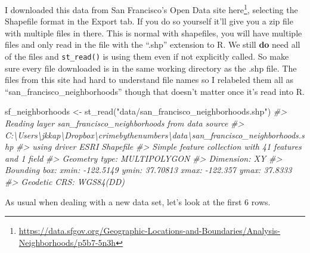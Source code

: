 \documentclass[
]{krantz}
\makeatletter
\newenvironment{Shaded}{\begin{snugshade}}{\end{snugshade}}
\newcommand{\CommentTok}[1]{\textcolor[rgb]{0.37,0.37,0.37}{\textit{#1}}}
\newcommand{\FunctionTok}[1]{\textcolor[rgb]{0,0,0}{#1}}
\newcommand{\NormalTok}[1]{#1}
\newcommand{\OtherTok}[1]{\textcolor[rgb]{0.37,0.37,0.37}{#1}}
\newcommand{\StringTok}[1]{\textcolor[rgb]{0.5,0.5,0.5}{#1}}
\renewcommand{\href}[2]{#2\footnote{\url{#1}}}
\newenvironment{kframe}{%
\medskip{}
\setlength{\fboxsep}{.8em}
 \def\at@end@of@kframe{}%
 \ifinner\ifhmode%
  \def\at@end@of@kframe{\end{minipage}}%
  \begin{minipage}{\columnwidth}%
 \fi\fi%
 \def\FrameCommand##1{\hskip\@totalleftmargin \hskip-\fboxsep
 \colorbox{shadecolor}{##1}\hskip-\fboxsep
     \hskip-\linewidth \hskip-\@totalleftmargin \hskip\columnwidth}%
 \MakeFramed {\advance\hsize-\width
   \@totalleftmargin\z@ \linewidth\hsize
   \@setminipage}}%
 {\par\unskip\endMakeFramed%
 \at@end@of@kframe}
\renewenvironment{Shaded}{\begin{kframe}}{\end{kframe}}
\makeatother
\begin{document}
I downloaded this data from San Francisco's Open Data site \href{https://data.sfgov.org/Geographic-Locations-and-Boundaries/Analysis-Neighborhoods/p5b7-5n3h}{here}, selecting the Shapefile format in the Export tab. If you do so yourself it'll give you a zip file with multiple files in there. This is normal with shapefiles, you will have multiple files and only read in the file with the ``.shp'' extension to R. We still \textbf{do} need all of the files and \texttt{st\_read()} is using them even if not explicitly called. So make sure every file downloaded is in the same working directory as the .shp file. The files from this site had hard to understand file names so I relabeled them all as ``san\_francisco\_neighborhoods'' though that doesn't matter once it's read into R.

\begin{Shaded}
\begin{Highlighting}[]
\NormalTok{sf\_neighborhoods }\OtherTok{\textless{}{-}} \FunctionTok{st\_read}\NormalTok{(}\StringTok{"data/san\_francisco\_neighborhoods.shp"}\NormalTok{)}
\CommentTok{\#\textgreater{} Reading layer \textasciigrave{}san\_francisco\_neighborhoods\textquotesingle{} from data source }
\CommentTok{\#\textgreater{}   \textasciigrave{}C:\textbackslash{}Users\textbackslash{}jkkap\textbackslash{}Dropbox\textbackslash{}crimebythenumbers\textbackslash{}data\textbackslash{}san\_francisco\_neighborhoods.shp\textquotesingle{} }
\CommentTok{\#\textgreater{}   using driver \textasciigrave{}ESRI Shapefile\textquotesingle{}}
\CommentTok{\#\textgreater{} Simple feature collection with 41 features and 1 field}
\CommentTok{\#\textgreater{} Geometry type: MULTIPOLYGON}
\CommentTok{\#\textgreater{} Dimension:     XY}
\CommentTok{\#\textgreater{} Bounding box:  xmin: {-}122.5149 ymin: 37.70813 xmax: {-}122.357 ymax: 37.8333}
\CommentTok{\#\textgreater{} Geodetic CRS:  WGS84(DD)}
\end{Highlighting}
\end{Shaded}

As usual when dealing with a new data set, let's look at the first 6 rows.
\end{document}
